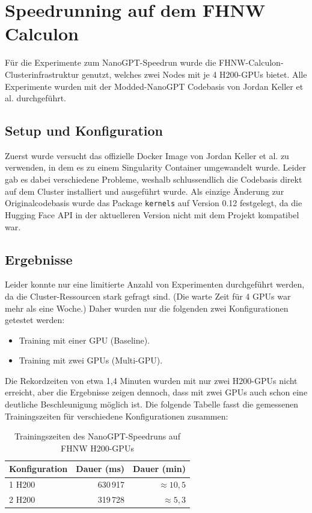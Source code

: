 \section{Speedrunning auf dem FHNW Calculon}
Für die Experimente zum NanoGPT-Speedrun wurde die FHNW-Calculon-Clusterinfrastruktur genutzt, welches zwei Nodes mit je 4 H200-GPUs bietet. Alle Experimente wurden mit der Modded-NanoGPT Codebasis von Jordan Keller et al. \cite{keller_modded_nanogpt_2024} durchgeführt.

\subsection*{Setup und Konfiguration}
Zuerst wurde versucht das offizielle Docker Image von Jordan Keller et al. \cite{keller_modded_nanogpt_2024} zu verwenden, in dem es zu einem Singularity Container umgewandelt wurde. Leider gab es dabei verschiedene Probleme, weshalb schlussendlich die Codebasis direkt auf dem Cluster installiert und ausgeführt wurde. Als einzige Änderung zur Originalcodebasis wurde das Package \texttt{kernels} auf Version 0.12 festgelegt, da die Hugging Face API in der aktuelleren Version nicht mit dem Projekt kompatibel war.

\subsection*{Ergebnisse}
Leider konnte nur eine limitierte Anzahl von Experimenten durchgeführt werden, da die Cluster-Ressourcen stark gefragt sind. (Die warte Zeit für 4 GPUs war mehr als eine Woche.) Daher wurden nur die folgenden zwei Konfigurationen getestet werden:

\begin{itemize}
    \item Training mit einer GPU (Baseline).
    \item Training mit zwei GPUs (Multi-GPU).
\end{itemize}

Die Rekordzeiten von etwa 1,4 Minuten wurden mit nur zwei H200-GPUs nicht erreicht, aber die Ergebnisse zeigen dennoch, dass mit zwei GPUs auch schon eine deutliche Beschleunigung möglich ist. Die folgende Tabelle fasst die gemessenen Trainingszeiten für verschiedene Konfigurationen zusammen:

\begin{table}[h]
\centering
\caption{Trainingszeiten des NanoGPT-Speedruns auf FHNW H200-GPUs}
\label{tab:results}
\begin{tabular}{lrr}
\hline
\textbf{Konfiguration} & \textbf{Dauer (ms)} & \textbf{Dauer (min)} \\
\hline
1 H200                        & 630\,917 & $\approx 10{,}5$ \\
2 H200                        & 319\,728 & $\approx 5{,}3$ \\
\hline
\end{tabular}
\end{table}

